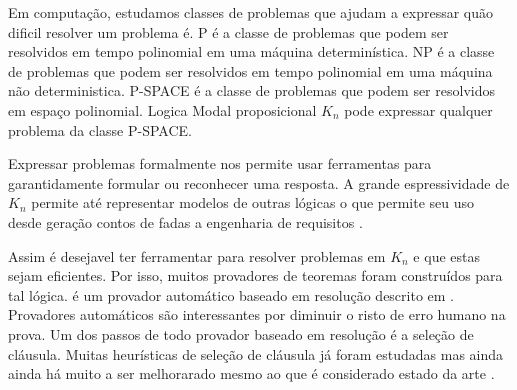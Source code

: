 



Em computação, estudamos classes de problemas que ajudam a expressar quão dificil resolver um problema é. P é a classe de problemas que podem ser resolvidos em tempo polinomial em uma máquina determinística. NP é a classe de problemas que podem ser resolvidos em tempo polinomial em uma máquina não deterministica. P-SPACE é a classe de problemas que podem ser resolvidos em espaço polinomial. %
Logica Modal proposicional $K_n$ pode expressar qualquer problema da classe P-SPACE. %

Expressar problemas formalmente nos permite usar ferramentas para garantidamente formular ou reconhecer uma resposta.
A grande espressividade de $K_n$ permite até representar modelos de outras lógicas \cite{correspkn} o que permite seu uso desde geração contos de fadas \cite{fairytale} a engenharia de requisitos \cite{reqeng}.

Assim é desejavel ter ferramentar para resolver problemas em $K_n$ e que estas sejam eficientes. Por isso, muitos provadores de teoremas foram construídos para tal lógica. \ksp é um provador automático baseado em resolução descrito em \cite{Nalon2020}. Provadores automáticos são interessantes por diminuir o risto de erro humano na prova. Um dos passos de todo provador baseado em resolução é a seleção de cláusula. Muitas heurísticas de seleção de cláusula já foram estudadas mas ainda ainda há muito a ser melhorarado mesmo ao que é considerado estado da arte \cite{stephan}.

